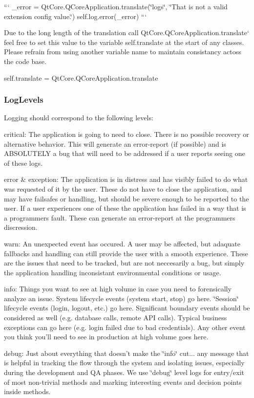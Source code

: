 ``` \+\_\+error = Qt\+Core.\+Q\+Core\+Application.\+translate(\char`\"{}logs\char`\"{}, \char`\"{}\+That is not a valid extension config value.\char`\"{}) self.\+log.\+error(\+\_\+error) ```

Due to the long length of the translation call {\ttfamily Qt\+Core.\+Q\+Core\+Application.\+translate}` feel free to set this value to the variable self.\+translate at the start of any classes. Please refrain from using another variable name to maintain consistancy actoss the code base.

{\ttfamily self.\+translate = Qt\+Core.\+Q\+Core\+Application.\+translate}

\subsubsection*{Log\+Levels}

Logging should correspond to the following levels\+:


\begin{DoxyItemize}
\item critical\+: The application is going to need to close. There is no possible recovery or alternative behavior. This will generate an error-\/report (if possible) and is A\+B\+S\+O\+L\+U\+T\+E\+L\+Y a bug that will need to be addressed if a user reports seeing one of these logs.
\item error \& exception\+: The application is in distress and has visibly failed to do what was requested of it by the user. These do not have to close the application, and may have failsafes or handling, but should be severe enough to be reported to the user. If a user experiences one of these the application has failed in a way that is a programmers fault. These can generate an error-\/report at the programmers discression.
\item warn\+: An unexpected event has occured. A user may be affected, but adaquate fallbacks and handling can still provide the user with a smooth experience. These are the issues that need to be tracked, but are not neccesarily a bug, but simply the application handling inconsistant environmental conditions or usage.
\item info\+: Things you want to see at high volume in case you need to forensically analyze an issue. System lifecycle events (system start, stop) go here. \char`\"{}\+Session\char`\"{} lifecycle events (login, logout, etc.) go here. Significant boundary events should be considered as well (e.\+g. database calls, remote A\+P\+I calls). Typical business exceptions can go here (e.\+g. login failed due to bad credentials). Any other event you think you'll need to see in production at high volume goes here.
\item debug\+: Just about everything that doesn't make the \char`\"{}info\char`\"{} cut... any message that is helpful in tracking the flow through the system and isolating issues, especially during the development and Q\+A phases. We use \char`\"{}debug\char`\"{} level logs for entry/exit of most non-\/trivial methods and marking interesting events and decision points inside methods.
\end{DoxyItemize}

